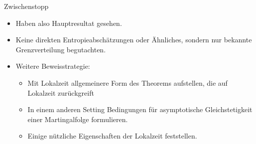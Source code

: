 \begin{frame}{Zwischenstopp}
    \begin{itemize}
        \item Haben also Hauptresultat gesehen. 
        \item Keine direkten Entropieabschätzungen oder Ähnliches, sondern nur bekannte Grenzverteilung begutachten.
        \item Weitere Beweisstrategie: 
        \begin{itemize}
            \item[(1)] Mit Lokalzeit allgemeinere Form des Theorems aufstellen, die auf Lokalzeit zurückgreift
            \item[(2)] In einem anderen Setting Bedingungen für asymptotische Gleichstetigkeit einer Martingalfolge formulieren.
            \item[(3)] Einige nützliche Eigenschaften der Lokalzeit feststellen. 
        \end{itemize}
    \end{itemize}
\end{frame}

